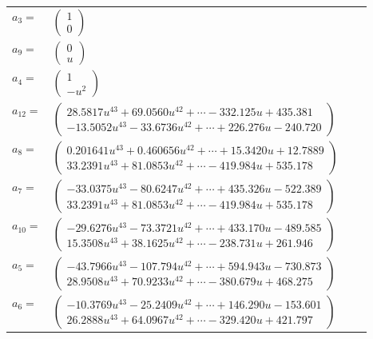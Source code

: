 \documentclass[1p]{elsarticle_modified}
\theoremstyle{definition}
\begin{document}
\begin{tabular}{m{7pt} m{180pt} m{7pt} m{180pt} }
\flushright $a_{3}=$&$\begin{pmatrix}1\\0\end{pmatrix}$ \\
\flushright $a_{9}=$&$\begin{pmatrix}0\\u\end{pmatrix}$ \\
\flushright $a_{4}=$&$\begin{pmatrix}1\\- u^2\end{pmatrix}$ \\
\flushright $a_{12}=$&$\begin{pmatrix}28.5817 u^{43}+69.0560 u^{42}+\cdots-332.125 u+435.381\\-13.5052 u^{43}-33.6736 u^{42}+\cdots+226.276 u-240.720\end{pmatrix}$ \\
\flushright $a_{8}=$&$\begin{pmatrix}0.201641 u^{43}+0.460656 u^{42}+\cdots+15.3420 u+12.7889\\33.2391 u^{43}+81.0853 u^{42}+\cdots-419.984 u+535.178\end{pmatrix}$ \\
\flushright $a_{7}=$&$\begin{pmatrix}-33.0375 u^{43}-80.6247 u^{42}+\cdots+435.326 u-522.389\\33.2391 u^{43}+81.0853 u^{42}+\cdots-419.984 u+535.178\end{pmatrix}$ \\
\flushright $a_{10}=$&$\begin{pmatrix}-29.6276 u^{43}-73.3721 u^{42}+\cdots+433.170 u-489.585\\15.3508 u^{43}+38.1625 u^{42}+\cdots-238.731 u+261.946\end{pmatrix}$ \\
\flushright $a_{5}=$&$\begin{pmatrix}-43.7966 u^{43}-107.794 u^{42}+\cdots+594.943 u-730.873\\28.9508 u^{43}+70.9233 u^{42}+\cdots-380.679 u+468.275\end{pmatrix}$ \\
\flushright $a_{6}=$&$\begin{pmatrix}-10.3769 u^{43}-25.2409 u^{42}+\cdots+146.290 u-153.601\\26.2888 u^{43}+64.0967 u^{42}+\cdots-329.420 u+421.797\end{pmatrix}$ \\

\end{tabular}
\end{document}
